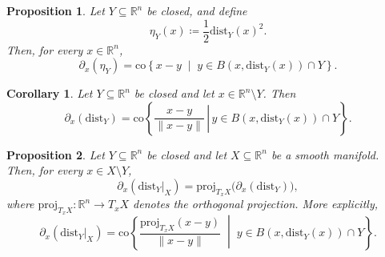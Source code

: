 \documentclass[10pt,a4paper]{amsart}
\newtheorem{proposition}{Proposition}
\newtheorem{corollary}{Corollary}
\newcommand{\R}{\mathbb{R}}
\newcommand{\dd}{\mathrm{dist}}
\newcommand{\dist}{{\mathrm{dist}_Y|_X}}
\begin{document}
\begin{proposition}\label{P:squared-distance-subgradient}
Let $Y \subseteq \R^n$ be closed, and define
\[
\eta_Y(x)\coloneqq \frac{1}{2}\dd_Y(x)^2.
\]
Then, for every $x \in \R^n$,
\[
\partial_x(\eta_Y)= \mathrm{co}\left\{ x-y \;\middle|\; y \in B(x,\dd_Y(x)) \cap Y \right\}.
\]
\end{proposition}

\begin{corollary}\label{propo:subgradient1}
Let $Y\subseteq \R^n$ be closed and let $x\in \R^n \setminus Y$. Then
\[
\partial_x(\dd_Y) = \mathrm{co}\left\{
\left.
\frac{x-y}{\|x-y\|}
\,\right|\,
y \in B(x,\dd_Y(x)) \cap Y
\right\}.
\]
\end{corollary}

\begin{proposition}\label{propo:subgradient2}
Let $Y \subseteq \R^n$ be closed and let $X \subseteq \R^n$ be a smooth manifold. Then, for every $x \in X \setminus Y$,
\[
\partial_x(\dist)=\mathrm{proj}_{T_xX}\bigl(\partial_x(\dd_Y)\bigr),
\]
where $\mathrm{proj}_{T_xX}\colon \R^n \to T_xX$ denotes the orthogonal projection. More explicitly,
\[
\partial_x(\dist)
=
\mathrm{co}\left\{
\frac{\mathrm{proj}_{T_xX}(x-y)}{\|x-y\|}
\;\middle|\;
y \in B(x,\dd_Y(x)) \cap Y
\right\}.
\]
\end{proposition}
\end{document}
